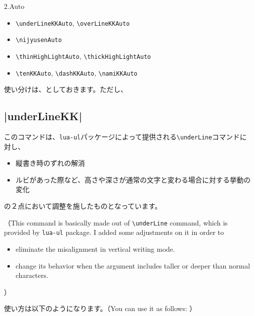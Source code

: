 \documentclass[luatex,fontsize=8pt,paper=b5,twoside]{jlreq}%
\begin{document}
\noindent 2.Auto
\begin{itemize}
  \item \verb|\underLineKKAuto|, \verb|\overLineKKAuto|
  \item \verb|\nijyusenAuto|
  \item \verb|\thinHighLightAuto|, \verb|\thickHighLightAuto|
  \item \verb|\tenKKAuto|, \verb|\dashKKAuto|, \verb|\namiKKAuto|
\end{itemize}

使い分けは、としておきます。ただし、

\subsection{\KKverb|underLineKK|}
このコマンドは、\texttt{lua-ul}パッケージによって提供される\verb|\underLine|コマンドに対し、

\begin{itemize}
  \item 縦書き時のずれの解消
  \item ルビがあった際など、高さや深さが通常の文字と変わる場合に対する挙動の変化
\end{itemize}

\noindent の２点において調整を施したものとなっています。

（This command is basically made out of \verb|\underLine| command, which is provided by \texttt{lua-ul} package. I added some adjustments on it in order to 
\begin{itemize}
  \item eliminate the misalignment in vertical writing mode.
  \item change its behavior when the argument includes taller or deeper than normal characters.
\end{itemize}
）

使い方は以下のようになります。（You can use it as follows: ）

\end{document}
